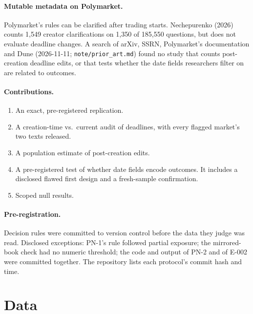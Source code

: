 \documentclass[10pt]{article}
\begin{document}
\paragraph{Mutable metadata on Polymarket.} Polymarket's rules can be clarified
after trading starts. Nechepurenko (2026) counts 1,549 creator clarifications
on 1,350 of 185,550 questions, but does not evaluate deadline changes. A search of
arXiv, SSRN, Polymarket's documentation and Dune (2026-11-11;
\texttt{note/prior\_art.md}) found no study that counts post-creation deadline
edits, or that tests whether the date fields researchers filter on are related
to outcomes.

\paragraph{Contributions.}
\begin{enumerate}[nosep]
  \item An exact, pre-registered replication.
  \item A creation-time vs.\ current audit of deadlines, with every flagged
        market's two texts released.
  \item A population estimate of post-creation edits.
  \item A pre-registered test of whether date fields encode outcomes. It
        includes a disclosed flawed first design and a fresh-sample
        confirmation.
  \item Scoped null results.
\end{enumerate}

\paragraph{Pre-registration.} Decision rules were committed to version
control before the data they judge was read. Disclosed exceptions: PN-1's
rule followed partial exposure; the mirrored-book check had no numeric
threshold; the code and output of PN-2 and of E-002 were committed together. The repository lists each
protocol's commit hash and time.

\section{Data}
\end{document}
